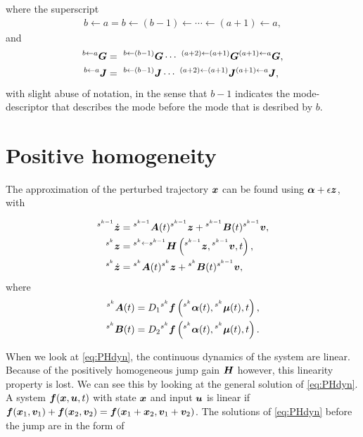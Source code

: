\documentclass[../DC2017114Bouma.tex]{subfiles}
\begin{document}
where the superscript
\begin{align}
b\leftarrow a =b\leftarrow (b-1) \leftarrow \cdots \leftarrow (a+1) \leftarrow a,
\end{align}
and
\begin{align}
^{b\leftarrow a}\Gb &=\ ^{b\leftarrow (b-1)}\Gb\cdots\ ^{(a+2)\leftarrow (a+1)}\Gb^{(a+1)\leftarrow a}\Gb,\\
^{b\leftarrow a}\Jb &=\ ^{b\leftarrow (b-1)}\Jb\cdots\ ^{(a+2)\leftarrow (a+1)}\Jb^{(a+1)\leftarrow a}\Jb,
\end{align}
with slight abuse of notation, in the sense that $b-1$ indicates the mode-descriptor that describes the mode before the mode that is desribed by $b$.

\section{Positive homogeneity}\label{app:poshom}
The approximation of the perturbed trajectory ${\boldsymbol{x}}$ can be found using $\boldsymbol{\alpha} + \epsilon{\boldsymbol{z}}$, with

\begin{align}
\hspace{0cm}^{s^{k-1}}\dot{{\boldsymbol{z}}} &=\hspace{0cm}^{s^{k-1}}{\boldsymbol{A}}(t)\hspace{0cm}^{s^{k-1}}{\boldsymbol{z}} +\hspace{0cm}^{s^{k-1}}{\boldsymbol{B}}(t)\hspace{0cm}^{s^{k-1}}{\boldsymbol{v}},\nonumber\\
\hspace{0cm}^{s^{k}}{\boldsymbol{z}} &= \hspace{0cm}^{s^{k}\leftarrow s^{k-1}}{\boldsymbol{H}}\left(\hspace{0cm}^{s^{k-1}}{\boldsymbol{z}},\hspace{0cm}^{s^{k-1}}{\boldsymbol{v}},t\right),\label{eq:PHdyn}\\
\hspace{0cm}^{s^{k}}\dot{{\boldsymbol{z}}} &=\hspace{0cm}^{s^{k}}{\boldsymbol{A}}(t)\hspace{0cm}^{s^{k}}{\boldsymbol{z}} +\hspace{0cm}^{s^{k}}{\boldsymbol{B}}(t)\hspace{0cm}^{s^{k-1}}{\boldsymbol{v}},\nonumber
\end{align}
where
\begin{align}
^{s^{k}}{\boldsymbol{A}}(t) &= D_1\hspace{0cm}^{s^{k}}{\boldsymbol{f}}\left(\hspace{0cm}^{s^{k}}\boldsymbol{\alpha}(t),\hspace{0cm}^{s^{k}}\boldsymbol{\mu}(t),t\right),\\
^{s^{k}}{\boldsymbol{B}}(t) &= D_2\hspace{0cm}^{s^{k}}{\boldsymbol{f}}\left(\hspace{0cm}^{s^{k}}\boldsymbol{\alpha}(t),\hspace{0cm}^{s^{k}}\boldsymbol{\mu}(t),t\right).
\end{align}

When we look at \eqref{eq:PHdyn}, the continuous dynamics of the system are linear. Because of the positively homogeneous jump gain ${\boldsymbol{H}}$ however, this linearity property is lost. We can see this by looking at the general solution of \eqref{eq:PHdyn}. A system ${\boldsymbol{f}}({\boldsymbol{x}},{\boldsymbol{u}},t)$ with state ${\boldsymbol{x}}$ and input ${\boldsymbol{u}}$ is linear if ${\boldsymbol{f}}({\boldsymbol{x}}_1,{\boldsymbol{v}}_1) + {\boldsymbol{f}}({\boldsymbol{x}}_2,{\boldsymbol{v}}_2) = {\boldsymbol{f}}({\boldsymbol{x}}_1+{\boldsymbol{x}}_2,{\boldsymbol{v}}_1+{\boldsymbol{v}}_2)$. The solutions of \eqref{eq:PHdyn} before the jump are in the form of
\end{document}
